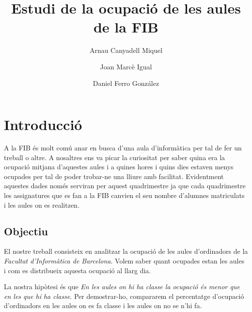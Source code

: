 \documentclass[a4paper, 12pt]{article}
\begin{document}
\title{Estudi de la ocupació de les aules de la FIB}
\author{Arnau Canyadell Miquel \and Joan Marcè Igual \and Daniel Ferro González}

\maketitle
\newpage
\tableofcontents

\newpage
\section{Introducció}

A la FIB és molt comú anar en busca d'una aula d'informàtica per tal de fer un treball o altre. A nosaltres ens va picar la curiositat per saber quina era la ocupació mitjana d'aquestes aules i a quines hores i quins dies estaven menys ocupades per tal de poder trobar-ne una lliure amb facilitat. Evidentment aquestes dades només serviran per aquest quadrimestre ja que cada quadrimestre les assignatures que es fan a la FIB canvien el seu nombre d'alumnes matriculats i les aules on es realitzen.

\subsection{Objectiu}

El nostre treball consisteix en analitzar la ocupació de les aules d'ordinadors de la \emph{Facultat d'Informàtica de Barcelona}. Volem saber quant ocupades estan les aules i com es distribueix aquesta ocupació al llarg dia.

La nostra hipòtesi és que \emph{En les aules on hi ha classe la ocupació és menor que en les que hi ha classe}. Per demostrar-ho, compararem el percentatge d'ocupació d'ordinadors en les aules on es fa classe i les aules on no se n'hi fa.






\end{document}
